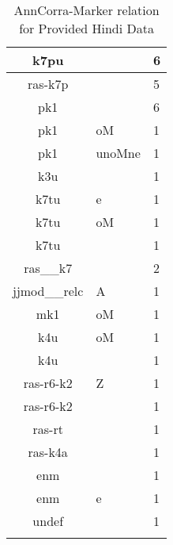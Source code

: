 \documentclass[a4 paper]{article}
\begin{document}
\begin{longtable}{cp{}p{}}
k7pu &  & 6\\ \midrule 
ras-k7p &  & 5\\ \midrule 
pk1 &  & 6\\ \midrule pk1 & oM & 1\\ \midrule pk1 & unoMne & 1\\ \midrule 
k3u &  & 1\\ \midrule 
k7tu & e & 1\\ \midrule k7tu & oM & 1\\ \midrule k7tu &  & 1\\ \midrule 
ras\_\_k7 &  & 2\\ \midrule 
jjmod\_\_relc & A & 1\\ \midrule 
mk1 & oM & 1\\ \midrule 
k4u & oM & 1\\ \midrule k4u &  & 1\\ \midrule 
ras-r6-k2 & Z & 1\\ \midrule ras-r6-k2 &  & 1\\ \midrule 
ras-rt &  & 1\\ \midrule 
ras-k4a &  & 1\\ \midrule 
enm &  & 1\\ \midrule enm & e & 1\\ \midrule 
undef &  & 1\\ \midrule 
\caption{AnnCorra-Marker relation for Provided Hindi Data}
\label{tab:annmarkertable}
\end{longtable}
\end{document}
